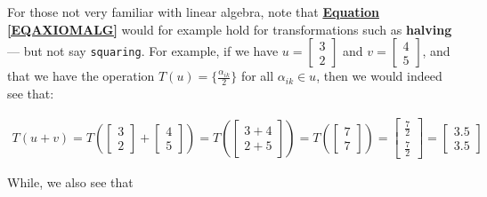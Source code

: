 \documentclass[a4paper, 18pt]{book} %
\begin{document}
\begin{appendices}
\vspace{2em}

For those not very familiar with linear algebra, note that \textbf{\hyperref[EQAXIOMALG]{Equation \ref{EQAXIOMALG}}} would for example hold for transformations such as \textbf{halving} --- but not say \texttt{squaring}. For example, if we have  $u = \left[\begin{smallmatrix}3\\2\end{smallmatrix}\right]$ and $v = \left[\begin{smallmatrix}4\\5\end{smallmatrix}\right]$, and that we have the operation $T(u) = \{\frac{\alpha_{ik}}{2}\}$ for all $\alpha_{ik} \in u$, then we would indeed see that:

\vspace{2em}


\begin{multline}
\label{EQTRANSLINALG1}
T(u+v) = T\left( \begin{bmatrix}3\\2\end{bmatrix} +  \begin{bmatrix}4\\5\end{bmatrix} \right) =  T\left( \begin{bmatrix}3+4\\2+5\end{bmatrix} \right) = T\left( \begin{bmatrix}7\\7\end{bmatrix} \right) = \begin{bmatrix}\frac{7}{2}\\\frac{7}{2}\end{bmatrix} = \begin{bmatrix}3.5\\3.5\end{bmatrix}
\end{multline}


\vspace{2em}

While, we also see that


\vspace{2em}



\end{appendices}
\end{document}

